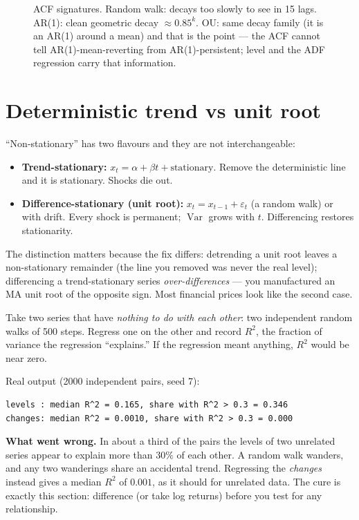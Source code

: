 \begin{figure}[ht]\centering

\caption{ACF signatures. Random walk: decays too slowly to see in 15
lags. AR(1): clean geometric decay $\approx0.85^k$. OU: same decay
family (it is an AR(1) around a mean) and that is the point --- the
ACF cannot tell AR(1)-mean-reverting from AR(1)-persistent; level
and the ADF regression carry that information.}
\label{fig:acf3}
\end{figure}

\section{Deterministic trend vs unit root}\label{sec:trend}
``Non-stationary'' has two flavours and they are not
interchangeable:
\begin{itemize}
\item \textbf{Trend-stationary:} $x_t=\alpha+\beta
t+\text{stationary}$. Remove the deterministic line and it is
stationary. Shocks die out.
\item \textbf{Difference-stationary (unit root):}
$x_t=x_{t-1}+\varepsilon_t$ (a random walk) or with drift. Every
shock is permanent; $\operatorname{Var}$ grows with $t$. Differencing
restores stationarity.
\end{itemize}
The distinction matters because the fix differs: detrending a unit
root leaves a non-stationary remainder (the line you removed was
never the real level); differencing a trend-stationary series
\emph{over-differences} --- you manufactured an MA unit root of the
opposite sign. Most financial prices look like the second case.

\begin{example}\label{ex:spurious}
Take two series that have \emph{nothing to do with each other}: two independent random
walks of 500 steps. Regress one on the other and record $R^2$, the fraction of variance the
regression ``explains.'' If the regression meant anything, $R^2$ would be near zero.

Real output (2000 independent pairs, seed 7):
\begin{lstlisting}[numbers=none]
levels : median R^2 = 0.165, share with R^2 > 0.3 = 0.346
changes: median R^2 = 0.0010, share with R^2 > 0.3 = 0.000
\end{lstlisting}
\textbf{What went wrong.} In about a third of the pairs the levels of two unrelated
series appear to explain more than $30\%$ of each other. A random walk wanders, and any two
wanderings share an accidental trend. Regressing the \emph{changes} instead gives a median
$R^2$ of $0.001$, as it should for unrelated data. The cure is exactly this section:
difference (or take log returns) before you test for any relationship.
\end{example}

